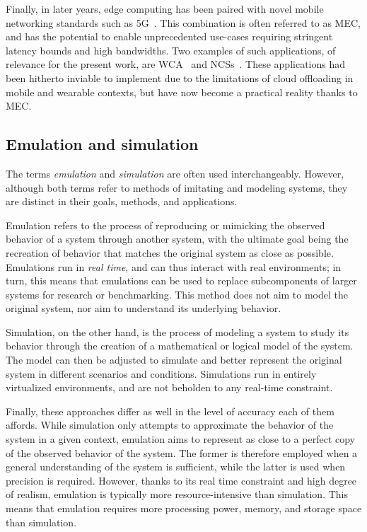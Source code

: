 Finally, in later years, edge computing has been paired with novel mobile networking standards such as 5G~\cite{hassan2019edge,pham2020survey,wan2020efficient}.
This combination is often referred to as \gls{MEC}, and has the potential to enable unprecedented use-cases requiring stringent latency bounds and high bandwidths.
Two examples of such applications, of relevance for the present work, are \acl{WCA}~\cite{ha2014towards,chen2018application,wang2020scaling,chen2017empirical,chen2018application} and \aclp{NCS}~\cite{sasaki2016vehicle,wang2018bandwidth,wan2020efficient}.
These applications had been hitherto inviable to implement due to the limitations of cloud offloading in mobile and wearable contexts, but have now become a practical reality thanks to \gls{MEC}.

\subsection{Emulation and simulation}

The terms \emph{emulation} and \emph{simulation} are often used interchangeably.
However, although both terms refer to methods of imitating and modeling systems, they are distinct in their goals, methods, and applications.

Emulation refers to the process of reproducing or mimicking the observed behavior of a system through another system, 
with the ultimate goal being the recreation of behavior that matches the original system as close as possible.
Emulations run in \emph{real time}, and can thus interact with real environments;
in turn, this means that emulations can be used to replace subcomponents of larger systems for research or benchmarking.
This method does not aim to model the original system, nor aim to understand its underlying behavior.

Simulation, on the other hand, is the process of modeling a system to study its behavior through the creation of a mathematical or logical model of the system.
The model can then be adjusted to simulate and better represent the original system in different scenarios and conditions.
Simulations run in entirely virtualized environments, and are not beholden to any real-time constraint.

Finally, these approaches differ as well in the level of accuracy each of them affords.
While simulation only attempts to approximate the behavior of the system in a given context, emulation aims to represent as close to a perfect copy of the observed behavior of the system.
The former is therefore employed when a general understanding of the system is sufficient, while the latter is used when precision is required.
However, thanks to its real time constraint and high degree of realism, emulation is typically more resource-intensive than simulation.
This means that emulation requires more processing power, memory, and storage space than simulation.

